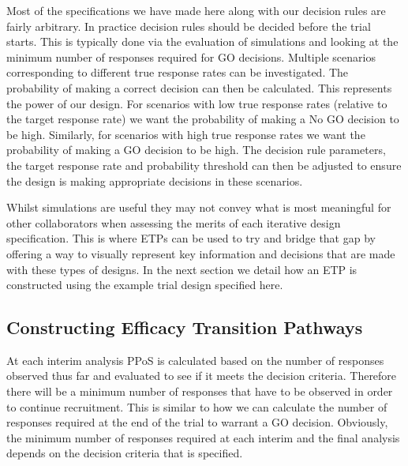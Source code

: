 Most of the specifications we have made here along with our decision rules are fairly arbitrary. In practice decision rules should be decided before the trial starts. This is typically done via the evaluation of simulations and looking at the minimum number of responses required for GO decisions. Multiple scenarios corresponding to different true response rates can be investigated. The probability of making a correct decision can then be calculated. This represents the power of our design. For scenarios with low true response rates (relative to the target response rate) we want the probability of making a No GO decision to be high. Similarly, for scenarios with high true response rates we want the probability of making a GO decision to be high. The decision rule parameters, the target response rate and probability threshold can then be adjusted to ensure the design is making appropriate decisions in these scenarios. 	

Whilst simulations are useful they may not convey what is most meaningful for other collaborators when assessing the merits of each iterative design specification. This is where ETPs can be used to try and bridge that gap by offering a way to visually represent key information and decisions that are made with these types of designs. In the next section we detail how an ETP is constructed using the example trial design specified here. 



\subsection{Constructing Efficacy Transition Pathways} 
\label{etp:conETPs}

At each interim analysis PPoS is calculated based on the number of responses observed thus far and evaluated to see if it meets the decision criteria. Therefore there will be a minimum number of responses that have to be observed in order to continue recruitment. This is similar to how we can calculate the number of responses required at the end of the trial to warrant a GO decision. Obviously, the minimum number of responses required at each interim and the final analysis depends on the decision criteria that is specified. 

